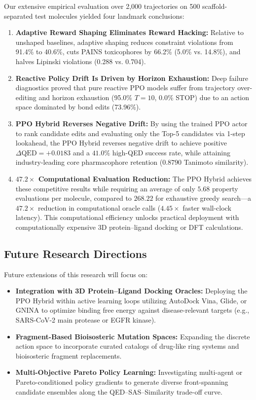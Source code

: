 \documentclass{ieeeaccess}
\begin{document}
Our extensive empirical evaluation over 2,000 trajectories on 500 scaffold-separated test molecules yielded four landmark conclusions:
\begin{enumerate}
    \item \textbf{Adaptive Reward Shaping Eliminates Reward Hacking:} Relative to unshaped baselines, adaptive shaping reduces constraint violations from 91.4\% to 40.6\%, cuts PAINS toxicophores by 66.2\% (5.0\% vs. 14.8\%), and halves Lipinski violations (0.288 vs. 0.704).
    \item \textbf{Reactive Policy Drift Is Driven by Horizon Exhaustion:} Deep failure diagnostics proved that pure reactive PPO models suffer from trajectory over-editing and horizon exhaustion (95.0\% $T=10$, 0.0\% STOP) due to an action space dominated by bond edits (73.96\%).
    \item \textbf{PPO Hybrid Reverses Negative Drift:} By using the trained PPO actor to rank candidate edits and evaluating only the Top-5 candidates via 1-step lookahead, the PPO Hybrid reverses negative drift to achieve positive $\Delta\text{QED} = +0.0183$ and a $41.0\%$ high-QED success rate, while attaining industry-leading core pharmacophore retention ($0.8790$ Tanimoto similarity).
    \item \textbf{$47.2\times$ Computational Evaluation Reduction:} The PPO Hybrid achieves these competitive results while requiring an average of only $\mathbf{5.68}$ property evaluations per molecule, compared to $\mathbf{268.22}$ for exhaustive greedy search---a $47.2\times$ reduction in computational oracle calls ($4.45\times$ faster wall-clock latency). This computational efficiency unlocks practical deployment with computationally expensive 3D protein--ligand docking or DFT calculations.
\end{enumerate}

\subsection{Future Research Directions}
Future extensions of this research will focus on:
\begin{itemize}
    \item \textbf{Integration with 3D Protein--Ligand Docking Oracles:} Deploying the PPO Hybrid within active learning loops utilizing AutoDock Vina, Glide, or GNINA to optimize binding free energy against disease-relevant targets (e.g., SARS-CoV-2 main protease or EGFR kinase).
    \item \textbf{Fragment-Based Bioisosteric Mutation Spaces:} Expanding the discrete action space to incorporate curated catalogs of drug-like ring systems and bioisosteric fragment replacements.
    \item \textbf{Multi-Objective Pareto Policy Learning:} Investigating multi-agent or Pareto-conditioned policy gradients to generate diverse front-spanning candidate ensembles along the QED--SAS--Similarity trade-off curve.
\end{itemize}
\end{document}
